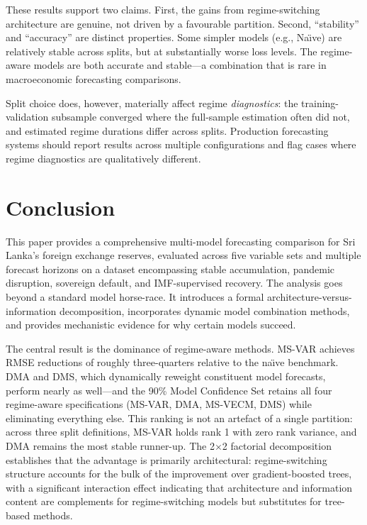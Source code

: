 \documentclass[12pt,a4paper]{article}
\begin{document}
These results support two claims. First, the gains from regime-switching architecture are genuine, not driven by a favourable partition. Second, ``stability'' and ``accuracy'' are distinct properties. Some simpler models (e.g., Na\"{\i}ve) are relatively stable across splits, but at substantially worse loss levels. The regime-aware models are both accurate and stable---a combination that is rare in macroeconomic forecasting comparisons.

Split choice does, however, materially affect regime \textit{diagnostics}: the training-validation subsample converged where the full-sample estimation often did not, and estimated regime durations differ across splits. Production forecasting systems should report results across multiple configurations and flag cases where regime diagnostics are qualitatively different.

\section{Conclusion}

This paper provides a comprehensive multi-model forecasting comparison for Sri Lanka's foreign exchange reserves, evaluated across five variable sets and multiple forecast horizons on a dataset encompassing stable accumulation, pandemic disruption, sovereign default, and IMF-supervised recovery. The analysis goes beyond a standard model horse-race. It introduces a formal architecture-versus-information decomposition, incorporates dynamic model combination methods, and provides mechanistic evidence for why certain models succeed.

The central result is the dominance of regime-aware methods. MS-VAR achieves RMSE reductions of roughly three-quarters relative to the na\"{\i}ve benchmark. DMA and DMS, which dynamically reweight constituent model forecasts, perform nearly as well---and the 90\% Model Confidence Set retains all four regime-aware specifications (MS-VAR, DMA, MS-VECM, DMS) while eliminating everything else. This ranking is not an artefact of a single partition: across three split definitions, MS-VAR holds rank 1 with zero rank variance, and DMA remains the most stable runner-up. The 2$\times$2 factorial decomposition establishes that the advantage is primarily architectural: regime-switching structure accounts for the bulk of the improvement over gradient-boosted trees, with a significant interaction effect indicating that architecture and information content are complements for regime-switching models but substitutes for tree-based methods.
\end{document}
